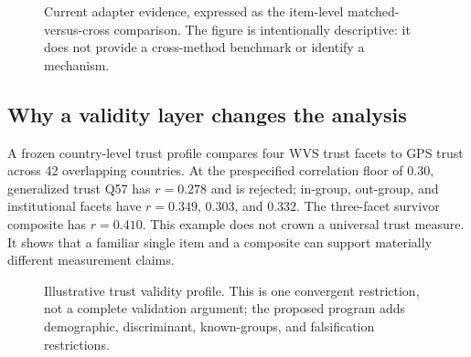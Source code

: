 \documentclass[10pt,letterpaper]{article}
\begin{document}
\begin{figure}[h]
\centering
{}
\caption{Current adapter evidence, expressed as the item-level matched-versus-cross comparison. The figure is intentionally descriptive: it does not provide a cross-method benchmark or identify a mechanism.}
\label{fig:adapter}
\end{figure}

\subsection{Why a validity layer changes the analysis}
A frozen country-level trust profile compares four WVS trust facets to GPS trust across 42 overlapping countries. At the prespecified correlation floor of $0.30$, generalized trust Q57 has $r=0.278$ and is rejected; in-group, out-group, and institutional facets have $r=0.349$, $0.303$, and $0.332$. The three-facet survivor composite has $r=0.410$. This example does not crown a universal trust measure. It shows that a familiar single item and a composite can support materially different measurement claims.

\begin{figure}[h]
\centering
{}
\caption{Illustrative trust validity profile. This is one convergent restriction, not a complete validation argument; the proposed program adds demographic, discriminant, known-groups, and falsification restrictions.}
\label{fig:trust}
\end{figure}
\end{document}
